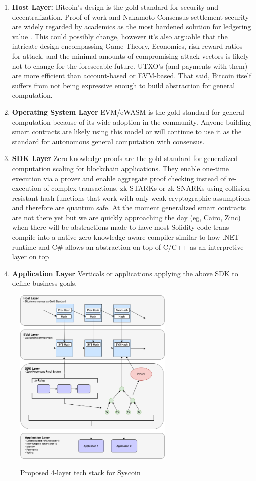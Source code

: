 \documentclass[peerreview]{ieeesyscoin}
\begin{document}
\begin{enumerate}
\item \textbf{Host Layer: }Bitcoin’s design is the gold standard for security and decentralization. Proof-of-work and Nakamoto Consensus settlement security are widely regarded by academics as the most hardened solution for ledgering value \cite{Bit15}. This could possibly change, however it's also arguable that the intricate design encompassing Game Theory, Economics, risk reward ratios for attack, and the minimal amounts of compromising attack vectors is likely not to change for the foreseeable future. UTXO’s (and payments with them) are more efficient than account-based or EVM-based. That said, Bitcoin itself suffers from not being expressive enough to build abstraction for general computation. 
\item \textbf{Operating System Layer} EVM/eWASM is the gold standard for general computation because of its wide adoption in the community. Anyone building smart contracts are likely using this model or will continue to use it as the standard for autonomous general computation with consensus.
\item \textbf{SDK Layer} Zero-knowledge proofs are the gold standard for generalized computation scaling for blockchain applications. They enable one-time execution via a prover and enable aggregate proof checking instead of re-execution of complex transactions. zk-STARKs or zk-SNARKs using collision resistant hash functions that work with only weak cryptographic assumptions and therefore are quantum safe. At the moment generalized smart contracts are not there yet but we are quickly approaching the day (eg, Cairo, Zinc) when there will be abstractions made to have most Solidity code trans-compile into a native zero-knowledge aware compiler similar to how .NET runtime and C\# allows an abstraction on top of C/C++ as an interpretive layer on top
\item \textbf{Application Layer} Verticals or applications applying the above SDK to define business goals. 
\end{enumerate}

\begin{figure}[h!]
\includegraphics[width=3in]{img/4_layer.png}
\label{fig:tech_stack}
\caption{Proposed 4-layer tech stack for Syscoin} 
\end{figure} 
\end{document}
